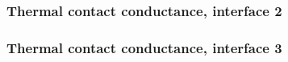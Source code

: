 \begin{frame}
	\frametitle{Thermal contact conductance, interface 2}
	\begin{figure}[H]		
		\legendagraficos
	\end{figure}
\end{frame}

%

\begin{frame}
	\frametitle{Thermal contact conductance, interface 3}
	\begin{figure}[H]		
		\legendagraficos
	\end{figure}
\end{frame}